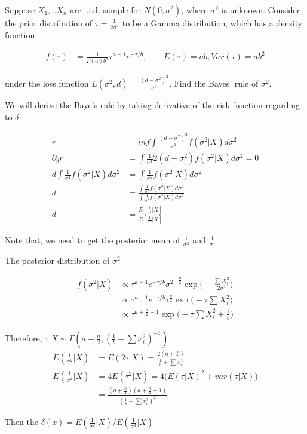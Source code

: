 \begin{Example}
Suppose $X_1, .. X_n$ are i.i.d. sample for $N(0, \sigma^2)$, where $\sigma^2$ is unknown. Consider the prior distribution of $\tau = \frac{1}{2\sigma^2}$ to be a Gamma distribution, which has a density function

 \begin{align*}
f(\tau) & = \frac{1}{\Gamma(a) b^a} \tau^{a-1} e^{-\tau/b}, \qquad E(\tau) = ab, Var(\tau) = ab^2
\end{align*}

under the loss function $L(\sigma^2, d) = \frac{(d- \sigma^2)^2}{\sigma^4}$. Find the Bayes' rule of $\sigma^2$.

We will derive the Baye's rule by taking derivative of the risk function regarding to $\delta$

 \begin{align*}
r & = inf \int \frac{(d - \sigma^2)^2}{\sigma^4} f(\sigma^2 | X) d\sigma^2 \\
\partial_{\delta} r &= \int \frac{1}{\sigma^4} 2 (d- \sigma^2) f(\sigma^2 | X) d \sigma^2 = 0 \\
d \int \frac{1}{\sigma^4}  f(\sigma^2 | X) d \sigma^2 & =  \int \frac{1}{\sigma^2}  f(\sigma^2 | X) d \sigma^2 \\
d &= \frac{\int \frac{1}{\sigma^2}  f(\sigma^2 | X) d \sigma^2 }{\int \frac{1}{\sigma^4}  f(\sigma^2 | X) d \sigma^2 } \\
d &= \frac{E [ \frac{1}{\sigma^2} | X]}{E [ \frac{1}{\sigma^4} | X]}
\end{align*}

Note that, we need to get the posterior mean of $\frac{1}{\sigma^2} $ and $\frac{1}{\sigma^4}$. 

The posterior distribution of $\sigma^2$ 

 \begin{align*}
f(\sigma^2 | X) & \propto \tau^{a-1} e^{-\tau/b} {\sigma^2}^{-\frac{n}{2}} \exp \Big( - \frac{\sum X_i^2}{2 \sigma^2} \Big) \\
& \propto  \tau^{a-1} e^{-\tau/b} {\tau}^{\frac{n}{2}} \exp \Big( - \tau {\sum X_i^2} \Big) \\
& \propto  \tau^{a + \frac{n}{2} -1} \exp \Big( - \tau {\sum X_i^2 + \frac{1}{b}} \Big)
\end{align*}

Therefore, $\tau| X \sim \Gamma(a + \frac{n}{2}, (\frac{1}{b} + \sum x_i^2)^{-1})$
 \begin{align*}
E(\frac{1}{ \sigma^2} | X) & =  E(2 \tau | X)  = \frac{2(a + \frac{n}{2})}{\frac{1}{b} + \sum x_i^2 } \\
E(\frac{1}{ \sigma^4} | X) & = 4 E(\tau^2 | X) = 4 \Big( E(\tau | X)^2 + var(\tau | X) \Big) \\
&= \frac{(a + \frac{n}{2})(a + \frac{n}{2} + 1)}{(\frac{1}{b} + \sum x_i^2)^2}
\end{align*}

Then the $\delta(x) = E(\frac{1}{ \sigma^2} | X) / E(\frac{1}{ \sigma^4} | X)$

\end{Example}
